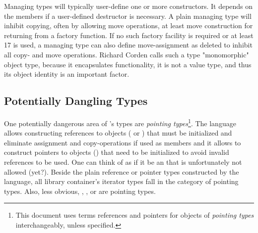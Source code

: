 \documentclass[ebook,11pt,article]{memoir}
\begin{document}
Managing types will typically user-define one or more constructors. It depends on the members if a user-defined destructor is necessary. A plain managing type will inhibit copying, often by allowing move operations, at least move construction for returning from a factory function. If no such factory facility is required or at least \Cpp{}17 is used, a managing type can also define move-assignment as deleted to inhibit all copy- and move operations. Richard Corden calls such a type "monomorphic" object type, because it encapsulates functionality, it is not a value type, and thus its object identity is an important factor.

\subsection{Potentially Dangling Types}

One potentially dangerous area of \Cpp{}'s types are \emph{pointing types}\footnote{This document uses terms references and pointers for objects of \emph{pointing types} interchangeably, unless specified.}. The language allows constructing references to objects ( or ) that must be initialized and eliminate assignment and copy-operations if used as members and it allows to construct pointers to objects () that need to be initialized to avoid invalid references to be used. One can think of  as if it be an  that is unfortunately not allowed (yet?). Beside the plain reference or pointer types constructed by the language, all library container's iterator types fall in the category of pointing types. Also, less obvious, , , or  are pointing types.
\end{document}
